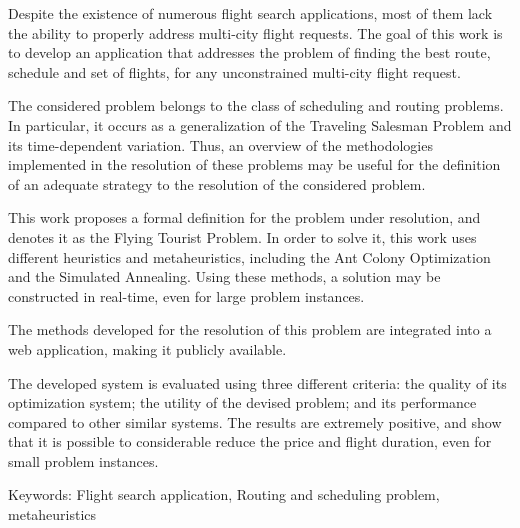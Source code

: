 
\noindent 


Despite the existence of numerous flight search applications, most of them lack the ability to properly address multi-city flight requests. The goal of this work is to develop an application that addresses the problem of finding the best route, schedule and set of flights, for any unconstrained multi-city flight request. 

The considered problem belongs to the class of scheduling and routing problems. In particular, it occurs as a generalization of the Traveling Salesman Problem and its time-dependent variation. Thus, an overview of the methodologies implemented in the resolution of these problems may be useful for the definition of an adequate strategy to the resolution of the considered problem. 

This work proposes a formal definition for the problem under resolution, and denotes it as the Flying Tourist Problem. In order to solve it, this work uses different heuristics and metaheuristics, including the Ant Colony Optimization and the Simulated Annealing. Using these methods, a solution may be constructed in real-time, even for large problem instances.

The methods developed for the resolution of this problem are integrated into a web application, making it publicly available.

The developed system is evaluated using three different criteria: the quality of its optimization system; the utility of the devised problem; and its performance compared to other similar systems. The results are extremely positive, and show that it is possible to
considerable reduce the price and flight duration, even for small problem instances. 

Keywords: Flight search application, Routing and scheduling problem, metaheuristics

